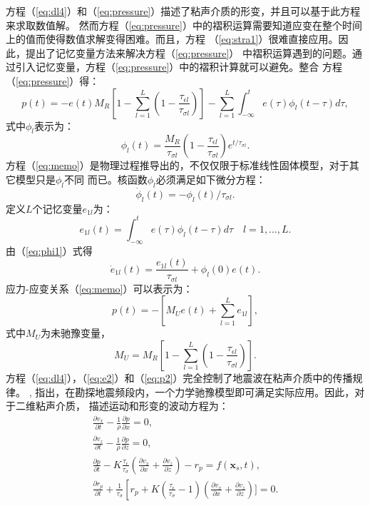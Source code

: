 方程（\ref{eq:dl4}）和（\ref{eq:pressure}）描述了粘声介质的形变，并且可以基于此方程来求取数值解。
然而方程（\ref{eq:pressure}）中的褶积运算需要知道应变在整个时间上的值而使得数值求解变得困难。而且，方程
（\ref{eq:stra1}）很难直接应用。因此，提出了记忆变量方法来解决方程（\ref{eq:pressure}）
中褶积运算遇到的问题。通过引入记忆变量，方程（\ref{eq:pressure}）中的褶积计算就可以避免。整合
方程（\ref{eq:pressure}）得：
\begin{equation}
	p(t)=-e(t)M_R[1-\sum_{l=1}^L(1-\frac{\tau_{\epsilon l}}{\tau_{\sigma l}})]-
	\sum_{l=1}^L\int_{-\infty}^{t}e(\tau)\phi_l(t-\tau)d\tau,
	\label{eq:memo}
\end{equation}
式中$\phi_l$表示为：
\begin{equation}
	\phi_l(t)=\frac{M_R}{\tau_{\sigma l}}(1-\frac{\tau_{\epsilon l}}{\tau_{\sigma l}})e^{t/\tau_{\sigma l}}.
	\label{eq:phi1}
\end{equation}
方程（\ref{eq:memo}）是物理过程推导出的，不仅仅限于标准线性固体模型，对于其它模型只是$\phi_l$不同
而已。核函数$\phi_l$必须满足如下微分方程：
\begin{equation}
	\dot{\phi}_l(t)=-\phi_l(t)/\tau_{\sigma l}.
	\label{eq:phi2}
\end{equation}
定义$L$个记忆变量$e_{1l}$为：
\begin{equation}
	e_{1l}(t)=\int^t_{-\infty}e(\tau)\phi_l(t-\tau)d\tau \quad l=1,\dots,L.
\end{equation}
由（\ref{eq:phi1}）式得
\begin{equation}
	\dot{e}_{1l}(t)=\frac{e_{1l}(t)}{\tau_{\sigma l}}+\phi_l(0)e(t).
	\label{eq:e2}
\end{equation}
应力-应变关系（\ref{eq:memo}）可以表示为：
\begin{equation}
	p(t)=-[M_Ue(t)+\sum_{l=1}^Le_{1l}],
	\label{eq:p2}
\end{equation}
式中$M_U$为未驰豫变量，
\begin{equation}
	M_U=M_R[1-\sum_{l=1}^L(1-\frac{\tau_{\epsilon l}}{\tau_{\sigma l}})].
\end{equation}
方程（\ref{eq:dl4}），（\ref{eq:e2}）和（\ref{eq:p2}）完全控制了地震波在粘声介质中的传播规律。
, 指出，在勘探地震频段内，一个力学驰豫模型即可满足实际应用。因此，对于二维粘声介质，
描述运动和形变的波动方程为：
\begin{equation}
    \begin{aligned}
    \label{eq:visco}
    \frac{\partial v_x}{\partial t} - \frac{1}{\rho}\frac{\partial p}{\partial x}=0,\\
    \frac{\partial v_z}{\partial t} - \frac{1}{\rho}\frac{\partial p}{\partial z}=0,\\
    \frac{\partial p}{\partial t} -
    K\frac{\tau_\epsilon}{\tau_\sigma}(\frac{\partial v_x}{\partial x}+\frac{\partial v_z}{\partial z})-r_p=f(\mathbf{x}_s,t),
    \\
    \frac{\partial{r_p}}{\partial t} +
    \frac{1}{\tau_\sigma}\left[r_p+K(\frac{\tau_\epsilon}{\tau_\sigma}-1)
	(\frac{\partial v_x}{\partial x}+\frac{\partial v_z}{\partial z})]=0.
    \end{aligned}
\end{equation}
